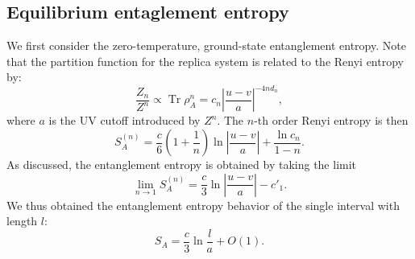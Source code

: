 \documentclass[aps,prb,superscriptaddress,nofootinbib]{revtex4}
\def \Tr{\operatorname{Tr}}
\begin{document}
\subsection{Equilibrium entaglement entropy}
We first consider the zero-temperature, ground-state entanglement entropy.
Note that the partition function for the replica system is related to the Renyi entropy by:
\begin{equation}
	\frac{Z_n}{Z^n} \propto \Tr \rho_A^n = c_n \left|\frac{u-v}{a}\right|^{-4n d_n},
\end{equation}
where $a$ is the UV cutoff introduced by $Z^n$.
The $n$-th order Renyi entropy is then
\begin{equation}
	S^{(n)}_A = \frac{c}{6}\left(1+\frac{1}{n}\right) \ln \left|\frac{u-v}{a}\right| + \frac{\ln c_n}{1-n}.
\end{equation}
As discussed, the entanglement entropy is obtained by taking the limit
\begin{equation}
	\lim_{n\rightarrow 1} S^{(n)}_A = \frac{c}{3}\ln\left|\frac{u-v}{a}\right| - c'_1.
\end{equation}
We thus obtained the entanglement entropy behavior of the single interval with length $l$:
\begin{equation}
	S_A = \frac{c}{3}\ln\frac{l}{a} + O(1).
\end{equation}
\end{document}
